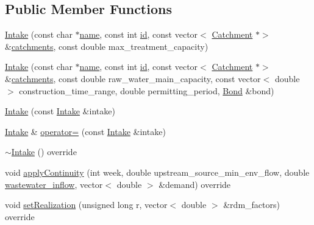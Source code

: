 \subsection*{Public Member Functions}
\begin{DoxyCompactItemize}
\item 
\mbox{\hyperlink{classIntake_a02e01801fcaede46e960d497e60eb335_a02e01801fcaede46e960d497e60eb335}{Intake}} (const char $\ast$\mbox{\hyperlink{classWaterSource_a846ea74c5b453d014f594d41fee8c765_a846ea74c5b453d014f594d41fee8c765}{name}}, const int \mbox{\hyperlink{classWaterSource_a6eafe5dfefd317877d1244e8a7c6e742_a6eafe5dfefd317877d1244e8a7c6e742}{id}}, const vector$<$ \mbox{\hyperlink{classCatchment}{Catchment}} $\ast$$>$ \&\mbox{\hyperlink{classWaterSource_a8c18c34f23f8a06685c1d12f462ed830_a8c18c34f23f8a06685c1d12f462ed830}{catchments}}, const double max\+\_\+treatment\+\_\+capacity)
\item 
\mbox{\hyperlink{classIntake_a41f51ae340129c31a4b2067c9f8ca0f9_a41f51ae340129c31a4b2067c9f8ca0f9}{Intake}} (const char $\ast$\mbox{\hyperlink{classWaterSource_a846ea74c5b453d014f594d41fee8c765_a846ea74c5b453d014f594d41fee8c765}{name}}, const int \mbox{\hyperlink{classWaterSource_a6eafe5dfefd317877d1244e8a7c6e742_a6eafe5dfefd317877d1244e8a7c6e742}{id}}, const vector$<$ \mbox{\hyperlink{classCatchment}{Catchment}} $\ast$$>$ \&\mbox{\hyperlink{classWaterSource_a8c18c34f23f8a06685c1d12f462ed830_a8c18c34f23f8a06685c1d12f462ed830}{catchments}}, const double raw\+\_\+water\+\_\+main\+\_\+capacity, const vector$<$ double $>$ construction\+\_\+time\+\_\+range, double permitting\+\_\+period, \mbox{\hyperlink{classBond}{Bond}} \&bond)
\item 
\mbox{\hyperlink{classIntake_aa81e2e35940482717fa67c33b6acd002_aa81e2e35940482717fa67c33b6acd002}{Intake}} (const \mbox{\hyperlink{classIntake}{Intake}} \&intake)
\item 
\mbox{\hyperlink{classIntake}{Intake}} \& \mbox{\hyperlink{classIntake_a41ce62d29c93527b4db7c7ab28ba46f1_a41ce62d29c93527b4db7c7ab28ba46f1}{operator=}} (const \mbox{\hyperlink{classIntake}{Intake}} \&intake)
\item 
\mbox{\hyperlink{classIntake_abf57ff6edf55f292921fb7838059ad26_abf57ff6edf55f292921fb7838059ad26}{$\sim$\+Intake}} () override
\item 
void \mbox{\hyperlink{classIntake_acd5ab74c4091b286e69ecdcc495d83ce_acd5ab74c4091b286e69ecdcc495d83ce}{apply\+Continuity}} (int week, double upstream\+\_\+source\+\_\+min\+\_\+env\+\_\+flow, double \mbox{\hyperlink{classWaterSource_aeb5a2d2d83383a70ca20f3e94635a9c7_aeb5a2d2d83383a70ca20f3e94635a9c7}{wastewater\+\_\+inflow}}, vector$<$ double $>$ \&demand) override
\item 
void \mbox{\hyperlink{classIntake_a879c4c780a4d21606e848f57464cf3b6_a879c4c780a4d21606e848f57464cf3b6}{set\+Realization}} (unsigned long r, vector$<$ double $>$ \&rdm\+\_\+factors) override
\end{DoxyCompactItemize}
